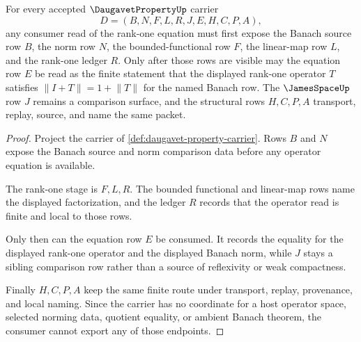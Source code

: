 \begin{theorem}
\label{thm:daugavet-property-rank-one-equation}
For every accepted $\DaugavetPropertyUp$ carrier
$$
D=(B,N,F,L,R,J,E,H,C,P,A),
$$
any consumer read of the rank-one equation must first expose the Banach source row $B$, the norm row $N$, the bounded-functional row $F$, the linear-map row $L$, and the rank-one ledger $R$. Only after those rows are visible may the equation row $E$ be read as the finite statement that the displayed rank-one operator $T$ satisfies $\lVert I+T\rVert=1+\lVert T\rVert$ for the named Banach row. The $\JamesSpaceUp$ row $J$ remains a comparison surface, and the structural rows $H,C,P,A$ transport, replay, source, and name the same packet.
\end{theorem}
\begin{proof}
Project the carrier of \autoref{def:daugavet-property-carrier}. Rows $B$ and $N$ expose the Banach source and norm comparison data before any operator equation is available.

The rank-one stage is $F,L,R$. The bounded functional and linear-map rows name the displayed factorization, and the ledger $R$ records that the operator read is finite and local to those rows.

Only then can the equation row $E$ be consumed. It records the equality for the displayed rank-one operator and the displayed Banach norm, while $J$ stays a sibling comparison row rather than a source of reflexivity or weak compactness.

Finally $H,C,P,A$ keep the same finite route under transport, replay, provenance, and local naming. Since the carrier has no coordinate for a host operator space, selected norming data, quotient equality, or ambient Banach theorem, the consumer cannot export any of those endpoints.
\end{proof}


